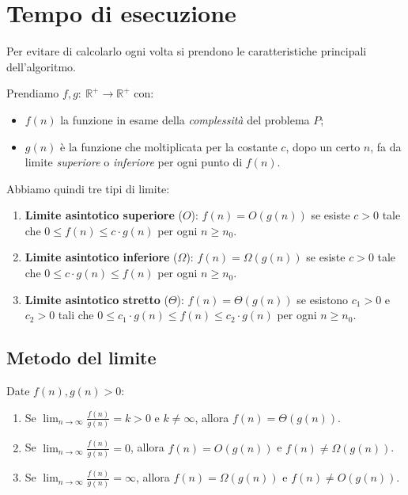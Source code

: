 \documentclass{article}
\begin{document}
\section{Tempo di esecuzione}

Per evitare di calcolarlo ogni volta si prendono le caratteristiche principali dell'algoritmo.

Prendiamo $f,g:\ \mathbb R^+\to\mathbb R^+$ con:
\begin{itemize}
    \item $f(n)$ la funzione in esame della \emph{complessità} del problema $P$;
    \item $g(n)$ è la funzione che moltiplicata per la costante $c$, dopo un certo $n$, fa da limite \emph{superiore} o \emph{inferiore} per ogni punto di $f(n)$.
\end{itemize}

Abbiamo quindi tre tipi di limite:
\begin{enumerate}
    \item \textbf{Limite asintotico superiore} ($O$): $f(n)=O(g(n))$ se esiste $c>0$ tale che $0\le f(n)\le c\cdot g(n)$ per ogni $n\ge n_{0}$.
    \item \textbf{Limite asintotico inferiore} ($\Omega$): $f(n)=\Omega(g(n))$ se esiste $c>0$ tale che $0\le c\cdot g(n)\le f(n)$ per ogni $n\ge n_{0}$.
    \item \textbf{Limite asintotico stretto} ($\Theta$): $f(n)=\Theta(g(n))$ se esistono $c_{1}>0$ e $c_{2}>0$ tali che $0\leq c_{1}\cdot g(n)\leq f(n)\leq c_{2}\cdot g(n)$ per ogni $n\geq n_{0}$.
\end{enumerate}

\subsection{Metodo del limite}

Date $f(n),g(n)>0$:
\begin{enumerate}
    \item Se $\displaystyle\lim_{n\to\infty}\frac{f(n)}{g(n)}=k>0$ e $k\ne\infty$, allora $f(n)=\Theta(g(n))$.
    \item Se $\displaystyle\lim_{n\to\infty}\frac{f(n)}{g(n)}=0$, allora $f(n)=O(g(n))$ e $f(n)\ne\Omega(g(n))$.
    \item Se $\displaystyle\lim_{n\to\infty}\frac{f(n)}{g(n)}=\infty$, allora $f(n)=\Omega(g(n))$ e $f(n)\ne O(g(n))$.
\end{enumerate}
\end{document}
